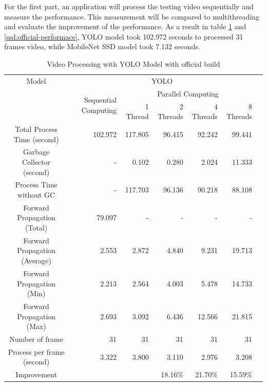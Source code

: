            For the first part, an application will process the testing video sequentially and measure the performance.
            This measurement will be compared to multithreading and evaluate the improvement of the performance.
            As a result in table \ref{yolo:official-performace} and \ref{ssd:official-performace},
            YOLO model took 102.972 seconds to processed 31 frames video, while MobileNet SSD model took 7.132 seconds.

            \begin{table}[!htp]\centering
                \scriptsize
                \begin{tabular}{lrrrrrrr}\toprule
                    \multicolumn{2}{c}{Model} &\multicolumn{5}{c}{YOLO} \\\cmidrule{1-7}
                    \multicolumn{2}{c}{\multirow{2}{*}{}} &\multirow{2}{*}{Sequential Computing} &\multicolumn{4}{c}{Parallel Computing} \\\cmidrule{4-7}
                    & & &1 Thread &2 Threads &4 Threads &8 Threads \\\midrule
                    \multicolumn{2}{c}{Total Process Time (second)} &102.972 &117.805 &96.415 &92.242 &99.441 \\
                    \multicolumn{2}{c}{Garbage Collector (second)} &- &0.102 &0.280 &2.024 &11.333 \\
                    \multicolumn{2}{c}{Process Time without GC} &- &117.703 &96.136 &90.218 &88.108 \\
                    \multicolumn{2}{c}{Forward Propagation (Total)} &79.097 &- &- &- &- \\
                    \multicolumn{2}{c}{Forward Propagation (Average)} &2.553 &2.872 &4.840 &9.231 &19.713 \\
                    \multicolumn{2}{c}{Forward Propagation (Min)} &2.213 &2.564 &4.003 &5.478 &14.733 \\
                    \multicolumn{2}{c}{Forward Propagation (Max)} &2.693 &3.092 &6.436 &12.566 &21.815 \\
                    \multicolumn{2}{c}{Number of frame} &31 &31 &31 &31 &31 \\
                    \multicolumn{2}{c}{Process per frame (second)} &3.322 &3.800 &3.110 &2.976 &3.208 \\
                    \multicolumn{2}{c}{Improvement} & & &18.16\% &21.70\% &15.59\% \\
                    \bottomrule
                \end{tabular}

                \caption{Video Processing with YOLO Model with official build}\label{yolo:official-performace}
            \end{table}

